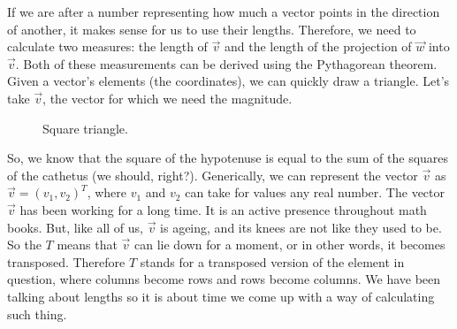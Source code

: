 \documentclass[600paper, 11pt,twoside,openany]{kdp}
\begin{document}
\indent If we are after a number representing how much a vector points in the direction of another, it makes sense for us to use their lengths. Therefore, we need to calculate two measures: the length of $\overrightarrow{v}$ and the length of the projection of $\overrightarrow{w}$ into $\overrightarrow{v}$. Both of these measurements can be derived using the Pythagorean theorem. Given a vector’s elements (the coordinates), we can quickly draw a triangle. Let’s take $\overrightarrow{v}$, the vector for which we need the magnitude. 
\begin{figure}[!htbp]
\begin{center}
\end{center}
\caption{Square triangle.}\label{fig:triangle}
\end{figure}

\indent So, we know that the square of the hypotenuse is equal to the sum of the squares of the cathetus  (we should, right?). Generically, we can represent the vector $\overrightarrow{v}$ as $\overrightarrow{v} = (v_1,v_2)^T$,  where $v_1$ and $v_2$ can take for values any real number. The vector $\overrightarrow{v}$ has been working for a long time. It is an active presence throughout math books. But, like all of us, $\overrightarrow{v}$ is ageing, and its knees are not like they used to be. So the $T$ means that $\overrightarrow{v}$ can lie down for a moment, or in other words, it becomes transposed. Therefore $T$ stands for a transposed version of the element in question, where columns become rows and rows become columns. We have been talking about lengths so it is about time we come up with a way of calculating such thing.
\end{document}
